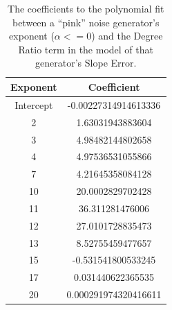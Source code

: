 \documentclass[preprint]{JASA}
\begin{document}
\begin{table}[ht]
  \caption{\label{tab:pink_model_coefficients}
    The coefficients to the polynomial fit between a ``pink'' noise generator's
    exponent ($\alpha <= 0$) and the Degree Ratio term in the model of that
    generator's Slope Error.
  }
  \begin{ruledtabular}
    \begin{tabular}{cc}
      Exponent & Coefficient\\
      \hline
      Intercept & -0.00227314914613336\\
      2 & 1.63031943883604\\
      3 & 4.98482144802658\\
      4 & 4.97536531055866\\
      7 & 4.21645358084128\\
      10 & 20.0002829702428\\
      11 & 36.311281476006\\
      12 & 27.0101728835473\\
      13 & 8.52755459477657\\
      15 & -0.531541800533245\\
      17 & 0.031440622365535\\
      20 & 0.000291974320416611\\
    \end{tabular}
  \end{ruledtabular}
\end{table}
\end{document}
